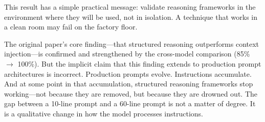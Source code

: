 \documentclass[11pt]{article}
\begin{document}
This result has a simple practical message: validate reasoning frameworks in the environment where they will be used, not in isolation. A technique that works in a clean room may fail on the factory floor.

The original paper's core finding---that structured reasoning outperforms context injection---is confirmed and strengthened by the cross-model comparison (85\% $\rightarrow$ 100\%). But the implicit claim that this finding extends to production prompt architectures is incorrect. Production prompts evolve. Instructions accumulate. And at some point in that accumulation, structured reasoning frameworks stop working---not because they are removed, but because they are drowned out. The gap between a 10-line prompt and a 60-line prompt is not a matter of degree. It is a qualitative change in how the model processes instructions.
\end{document}
